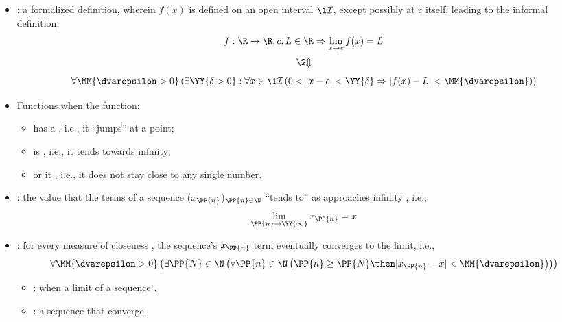 \begin{itemize}
\begin{itemize}
 \item {}: a formalized
   definition, wherein \(f(x)\) is defined on an open interval
   \(\1{\mathcal{I}}\), except possibly at \(c\) itself, leading to the
   informal definition, 
   \[
      f : \R \to \R, c,L \in \R \Rightarrow \lim_{x \to c} f(x) = L
    \]
    \vspace{-22pt}
   \[
    \2{\Updownarrow}
   \]
   \[
     \forall \MM{\dvarepsilon > 0} \left(
       \exists \YY{\delta > 0} : \forall x \in \1{\mathcal{I}} \left(
        0 < |x-c| < \YY{\delta} \Rightarrow |f(x)-L| < \MM{\dvarepsilon}
        \right)
      \right)
   \]
 \item Functions  when the function:
    \begin{itemize}
      \item has a , i.e., it ``jumps'' at a point;
      \item is , i.e., it tends towards infinity;
      \item or it , i.e., it does not stay close to any single number.
    \end{itemize}

  \item {}: the value that the terms of a sequence
    (\(x_\PP{n}\))\(_{\PP{n} \in \N}\) ``tends to''  as 
    approaches infinity , i.e.,
    \[
      \lim_{\PP{n} \to \YY{\infty}} x_\PP{n} = x
    \]
    \item {}: for every measure of
      closeness \MM{\( \varepsilon\)}, the sequence's \( x_\PP{n}\) term eventually
      converges to the limit, i.e.,
      \[
        \forall \MM{ \dvarepsilon > 0} \left(
          \exists \PP{N} \in \N \left(
            \forall\PP{n} \in \N \left(
              \PP{n} \ge \PP{N} \then |x_\PP{n} - x| < \MM{ \dvarepsilon}
            \right)
          \right)
        \right)
      \]
    \begin{itemize}
      \item {}: when a limit of a sequence .
      \item {}: a sequence that  converge.
    \end{itemize}

  \end{itemize}



\end{itemize}
